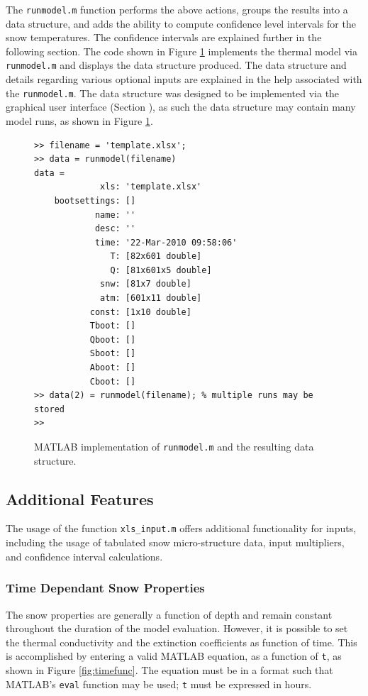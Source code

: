 The \texttt{runmodel.m} function performs the above actions, groups the results into a data structure, and adds the ability to compute confidence level intervals for the snow temperatures.  The confidence intervals are explained further in the following section.  The code shown in Figure \ref{TM:fig:runmodel} implements the thermal model via \texttt{runmodel.m} and displays the data structure produced.  The data structure and details regarding various optional inputs are explained in the help associated with the \texttt{runmodel.m}.  The data structure was designed to be implemented via the graphical user interface (Section ), as such the data structure may contain many model runs, as shown in Figure \ref{TM:fig:runmodel}.

\begin{figure}[ht!]
\begin{singlespaced}\begin{lstlisting}[style=figure]
>> filename = 'template.xlsx';
>> data = runmodel(filename)
data = 
             xls: 'template.xlsx'
    bootsettings: []
            name: ''
            desc: ''
            time: '22-Mar-2010 09:58:06'
               T: [82x601 double]
               Q: [81x601x5 double]
             snw: [81x7 double]
             atm: [601x11 double]
           const: [1x10 double]
           Tboot: []
           Qboot: []
           Sboot: []
           Aboot: []
           Cboot: []
>> data(2) = runmodel(filename); % multiple runs may be stored
>> 
\end{lstlisting}\end{singlespaced}
\caption{MATLAB implementation of \texttt{runmodel.m} and the resulting data structure.}
\label{TM:fig:runmodel}
\end{figure}

\FloatBarrier
\subsection{Additional Features}\label{TM:sec:features}
The usage of the function \texttt{xls\_input.m} offers additional functionality for inputs, including the usage of tabulated snow micro-structure data, input multipliers, and confidence interval calculations.

\subsubsection{Time Dependant Snow Properties}
The snow properties are generally a function of depth and remain constant throughout the duration of the model evaluation. However, it is possible to set the thermal conductivity and the extinction coefficients as function of time. This is accomplished by entering a valid MATLAB equation, as a function of \texttt{t}, as shown in Figure \ref{fig:timefunc}. The equation must be in a format such that MATLAB's \texttt{eval} function may be used; \texttt{t} must be expressed in hours.

